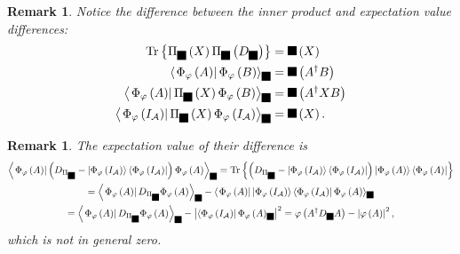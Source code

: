 \documentclass[aps,preprint]{revtex4}%
\providecommand{\U}[1]{\protect\rule{.1in}{.1in}}
\newtheorem{remark}[theorem]{Remark}
\begin{document}
\begin{remark}
Notice the difference between the inner product and expectation value
differences:
\begin{align}
\operatorname{Tr}\left\{  \Pi_{\U{3c6} }\left(  X\right)  \Pi_{\U{3c6}
}\left(  D_{\U{3c6} }\right)  \right\}   &  =\U{3c6} \left(  X\right) \\
\left\langle \left.  \Phi_{\varphi}\left(  A\right)  \right\vert \Phi
_{\varphi}\left(  B\right)  \right\rangle _{\U{3c6} }  &  =\U{3c6} \left(
A^{\dagger}B\right) \\
\left\langle \left.  \Phi_{\varphi}\left(  A\right)  \right\vert \Pi_{\U{3c6}
}\left(  X\right)  \Phi_{\varphi}\left(  B\right)  \right\rangle _{\U{3c6} }
&  =\U{3c6} \left(  A^{\dagger}XB\right) \\
\left\langle \left.  \Phi_{\varphi}\left(  I_{\mathcal{A}}\right)  \right\vert
\Pi_{\U{3c6} }\left(  X\right)  \Phi_{\varphi}\left(  I_{\mathcal{A}}\right)
\right\rangle _{\U{3c6} }  &  =\U{3c6} \left(  X\right)  .
\end{align}

\end{remark}

\begin{remark}
The expectation value of their difference is
\begin{gather}
\left\langle \left.  \Phi_{\varphi}\left(  A\right)  \right\vert \left(
D_{\Pi_{\U{3c6} }}-\left\vert \Phi_{\varphi}\left(  I_{\mathcal{A}}\right)
\right\rangle \left\langle \Phi_{\varphi}\left(  I_{\mathcal{A}}\right)
\right\vert \right)  \Phi_{\varphi}\left(  A\right)  \right\rangle _{\U{3c6}
}=\operatorname{Tr}\left\{  \left(  D_{\Pi_{\U{3c6} }}-\left\vert
\Phi_{\varphi}\left(  I_{\mathcal{A}}\right)  \right\rangle \left\langle
\Phi_{\varphi}\left(  I_{\mathcal{A}}\right)  \right\vert \right)  \left\vert
\Phi_{\varphi}\left(  A\right)  \right\rangle \left\langle \Phi_{\varphi
}\left(  A\right)  \right\vert \right\} \\
=\left\langle \left.  \Phi_{\varphi}\left(  A\right)  \right\vert
D_{\Pi_{\U{3c6} }}\Phi_{\varphi}\left(  A\right)  \right\rangle _{\U{3c6}
}-\left\langle \left.  \Phi_{\varphi}\left(  A\right)  \right\vert \left\vert
\Phi_{\varphi}\left(  I_{\mathcal{A}}\right)  \right\rangle \left\langle
\Phi_{\varphi}\left(  I_{\mathcal{A}}\right)  \right\vert \Phi_{\varphi
}\left(  A\right)  \right\rangle _{\U{3c6} }\\
=\left\langle \left.  \Phi_{\varphi}\left(  A\right)  \right\vert
D_{\Pi_{\U{3c6} }}\Phi_{\varphi}\left(  A\right)  \right\rangle _{\U{3c6}
}-\left\vert \left\langle \Phi_{\varphi}\left(  I_{\mathcal{A}}\right)
\right\vert \Phi_{\varphi}\left(  A\right)  _{\U{3c6} }\right\vert
^{2}=\varphi\left(  A^{\dagger}D_{\U{3c6} }A\right)  -\left\vert
\varphi\left(  A\right)  \right\vert ^{2},
\end{gather}
which is not in general zero.
\end{remark}
\end{document}
